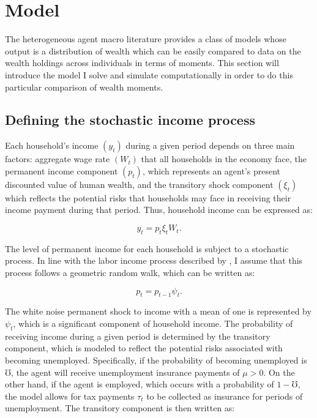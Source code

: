 \onlyinsubfile{\setcounter{section}{2}}
\section{Model}
\notinsubfile{\label{sec:Model}}

\par The heterogeneous agent macro literature provides a class of models whose output is a distribution of wealth which can be easily compared to data on the wealth holdings across individuals in terms of moments. This section will introduce the model I solve and simulate computationally in order to do this particular comparison of wealth moments. 

\subsection{Defining the stochastic income process}
 
\par Each household's income $(y_t)$ during a given period depends on three main factors: aggregate wage rate $(W_t)$ that all households in the economy face, the permanent income component $(p_t)$, which represents an agent's present discounted value of human wealth, and the transitory shock component $(\xi_t)$ which reflects the potential risks that households may face in receiving their income payment during that period. Thus, household income can be expressed as:

$$ y_t = p_t \xi_t W_t . $$

\par The level of permanent income for each household is subject to a stochastic process. In line with the labor income process described by \cite{mf1957}, I assume that this process follows a geometric random walk, which can be written as:

$$ p_t = p_{t-1} \psi_{t}. $$

\par The white noise permanent shock to income with a mean of one is represented by $\psi_t$, which is a significant component of household income. The probability of receiving income during a given period is determined by the transitory component, which is modeled to reflect the potential risks associated with becoming unemployed. Specifically, if the probability of becoming unemployed is $\mho$, the agent will receive unemployment insurance payments of $\mu > 0$. On the other hand, if the agent is employed, which occurs with a probability of $1 - \mho$, the model allows for tax payments $\tau_t$ to be collected as insurance for periods of unemployment. The transitory component is then written as:

